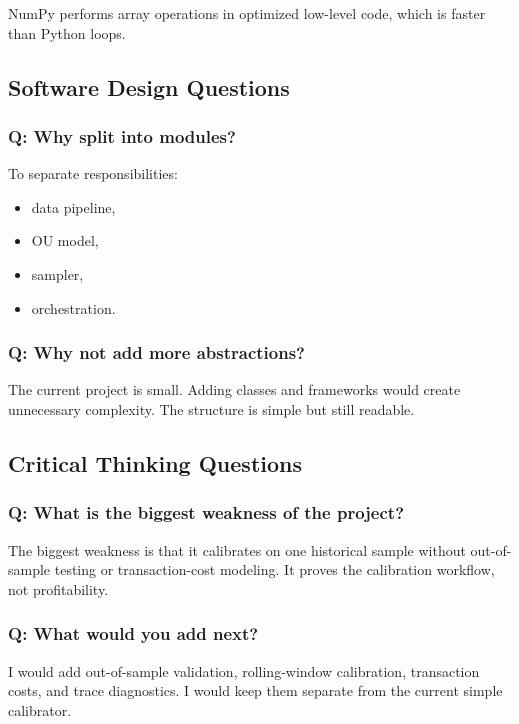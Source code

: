 \documentclass[11pt]{article}
\begin{document}
NumPy performs array operations in optimized low-level code, which is faster
than Python loops.

\subsection{Software Design Questions}

\subsubsection{Q: Why split into modules?}

To separate responsibilities:

\begin{itemize}
  \item data pipeline,
  \item OU model,
  \item sampler,
  \item orchestration.
\end{itemize}

\subsubsection{Q: Why not add more abstractions?}

The current project is small. Adding classes and frameworks would create
unnecessary complexity. The structure is simple but still readable.

\subsection{Critical Thinking Questions}

\subsubsection{Q: What is the biggest weakness of the project?}

The biggest weakness is that it calibrates on one historical sample without
out-of-sample testing or transaction-cost modeling. It proves the calibration
workflow, not profitability.

\subsubsection{Q: What would you add next?}

I would add out-of-sample validation, rolling-window calibration, transaction
costs, and trace diagnostics. I would keep them separate from the current simple
calibrator.
\end{document}

